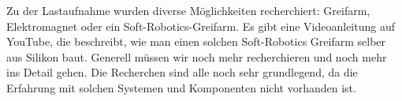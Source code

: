 \documentclass[a4paper,11pt]{scrartcl}
\begin{document}
Zu der Lastaufnahme wurden diverse Möglichkeiten recherchiert: Greifarm, Elektromagnet oder ein Soft-Robotics-Greif\-arm. Es gibt eine Videoanleitung auf YouTube, die beschreibt, wie man einen solchen Soft-Robotics Greifarm selber aus Silikon baut. Generell müssen wir noch mehr recherchieren und noch mehr ins Detail gehen. Die Recherchen sind alle noch sehr grundlegend, da die Erfahrung mit solchen Systemen und Komponenten nicht vorhanden ist.  
\end{document}
